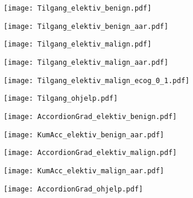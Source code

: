 \documentclass[norsk,a4paper]{article}\usepackage[]{graphicx}\usepackage[]{color}
\begin{document}
\begin{figure}[ht]
\centering
\texttt{[image: Tilgang\_elektiv\_benign.pdf]}
\caption{}
\end{figure}

\begin{figure}[ht]
\centering
\texttt{[image: Tilgang\_elektiv\_benign\_aar.pdf]}
\caption{}
\end{figure}

\begin{figure}[ht]
\centering
\texttt{[image: Tilgang\_elektiv\_malign.pdf]}
\caption{}
\end{figure}

\begin{figure}[ht]
\centering
\texttt{[image: Tilgang\_elektiv\_malign\_aar.pdf]}
\caption{}
\end{figure}

\begin{figure}[ht]
\centering
\texttt{[image: Tilgang\_elektiv\_malign\_ecog\_0\_1.pdf]}
\caption{}
\end{figure}

\begin{figure}[ht]
\centering
\texttt{[image: Tilgang\_ohjelp.pdf]}
\caption{}
\end{figure}

\begin{figure}[ht]
\centering
\texttt{[image: AccordionGrad\_elektiv\_benign.pdf]}
\caption{}
\end{figure}

\begin{figure}[ht]
\centering
\texttt{[image: KumAcc\_elektiv\_benign\_aar.pdf]}
\caption{}
\end{figure}

\begin{figure}[ht]
\centering
\texttt{[image: AccordionGrad\_elektiv\_malign.pdf]}
\caption{}
\end{figure}

\begin{figure}[ht]
\centering
\texttt{[image: KumAcc\_elektiv\_malign\_aar.pdf]}
\caption{}
\end{figure}

\begin{figure}[ht]
\centering
\texttt{[image: AccordionGrad\_ohjelp.pdf]}
\caption{}
\end{figure}
\end{document}
